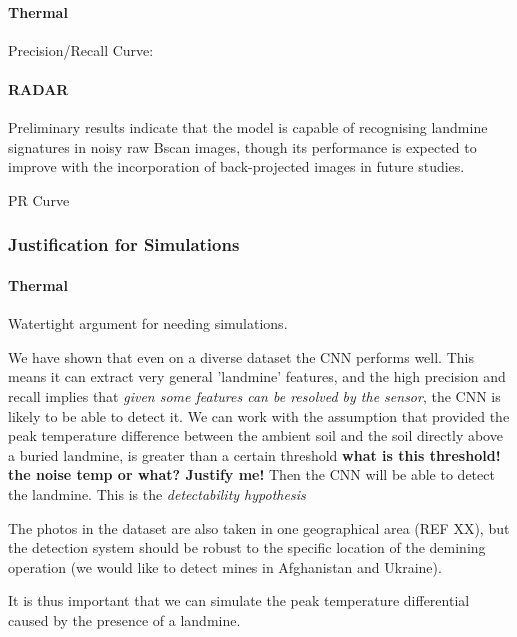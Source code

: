     \paragraph{Thermal}     
        
        Precision/Recall Curve: 
    
    \paragraph{RADAR} 
    
        Preliminary results indicate that the model is capable of recognising landmine signatures in noisy raw Bscan images, though its performance is expected to improve with the incorporation of back-projected images in future studies.

        PR Curve
    
\subsubsection{Justification for Simulations} \label{simulation_justification}


    \paragraph{Thermal} 
    
        Watertight argument for needing simulations.
        
        We have shown that even on a diverse dataset the CNN performs well. This means it can extract very general 'landmine' features, and the high precision and recall implies that \textit{given some features can be resolved by the sensor}, the CNN is likely to be able to detect it. We can work with the assumption that provided the peak temperature difference between the ambient soil and the soil directly above a buried landmine, is greater than a certain threshold \textbf{what is this threshold! the noise temp or what? Justify me!} Then the CNN will be able to detect the landmine. This is the \textit{detectability hypothesis}
        
        The photos in the dataset are also taken in one geographical area (REF XX), but the detection system should be robust to the specific location of the demining operation (we would like to detect mines in Afghanistan and Ukraine). 
        
        It is thus important that we can simulate the peak temperature differential caused by the presence of a landmine.
    
